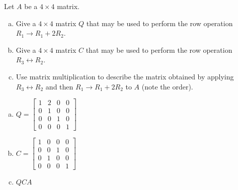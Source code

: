 
\begin{exerciseStatement}


Let \(A\) be a \(4 \times 4\) matrix.


\begin{enumerate}[(a)]
\item Give a \(4 \times 4\) matrix \(Q\) that may be used to perform the row operation \( R_1 \to R_1 + 2R_2 \).
\item Give a \(4 \times 4\) matrix \(C\) that may be used to perform the row operation \( R_3 \leftrightarrow R_2 \).
\item Use matrix multiplication to describe the matrix obtained by applying \( R_3 \leftrightarrow R_2 \) and then \( R_1 \to R_1 + 2R_2 \) to \(A\) (note the order). 
\end{enumerate}
    
\end{exerciseStatement}
    
\begin{exerciseAnswer} 

\begin{enumerate}[(a)]
\item \(Q= \left[\begin{array}{cccc}
1 & 2 & 0 & 0 \\
0 & 1 & 0 & 0 \\
0 & 0 & 1 & 0 \\
0 & 0 & 0 & 1
\end{array}\right] \)
\item \(C= \left[\begin{array}{cccc}
1 & 0 & 0 & 0 \\
0 & 0 & 1 & 0 \\
0 & 1 & 0 & 0 \\
0 & 0 & 0 & 1
\end{array}\right] \)
\item \(QCA\)
\end{enumerate}
    
\end{exerciseAnswer}
    
